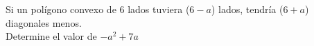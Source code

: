 Si un polígono convexo de 6 lados tuviera ($ 6-a $) lados, tendría ($ 6+a $)  diagonales menos.\\
Determine el valor de $ -a^2+7a $
